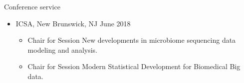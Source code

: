 \documentclass{resume} %
\begin{document}




\begin{rSection}{Conference service}

\begin{itemize}[noitemsep,topsep=0pt]

\item  ICSA, New Brunswick, NJ  \hfill {June 2018}
\begin{itemize}[noitemsep,topsep=0pt]
\item{Chair for Session New developments in microbiome sequencing data modeling and analysis.}
\item{Chair for Session Modern Statistical Development for Biomedical Big data.}
\end{itemize}


\end{itemize}

\end{rSection}
\end{document}
